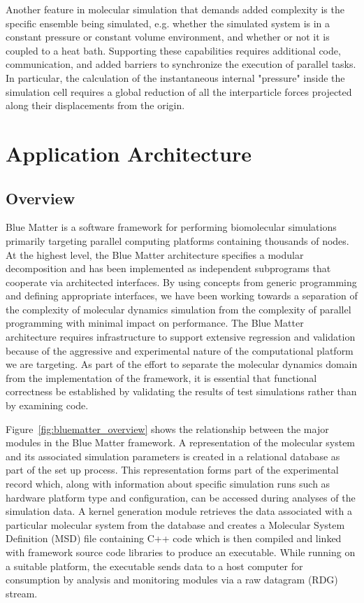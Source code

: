\documentclass[doublespacing]{elsart}
\begin{document}
Another feature in molecular simulation that demands added complexity
is the specific ensemble being simulated, e.g. whether the simulated
system is in a constant pressure or constant volume environment, and
whether or not it is coupled to a heat bath. Supporting these
capabilities requires additional code, communication, and added
barriers to synchronize the execution of parallel tasks.  In
particular, the calculation of the instantaneous internal "pressure"
inside the simulation cell requires a global reduction of all the
interparticle forces projected along their displacements from the
origin.

\section{Application Architecture}
\subsection{Overview}

Blue Matter is a software framework for performing biomolecular
simulations primarily targeting parallel computing platforms
containing thousands of nodes.  At the highest level, the Blue Matter
architecture specifies a modular decomposition and has been
implemented as independent subprograms that cooperate via architected
interfaces. By using concepts from generic
programming\cite{austern:1999} and defining appropriate interfaces, we
have been working towards a separation of the complexity of molecular
dynamics simulation from the complexity of parallel programming with
minimal impact on performance.  The Blue Matter architecture requires
infrastructure to support extensive regression and validation because
of the aggressive and experimental nature of the computational
platform we are targeting.  As part of the effort to separate the
molecular dynamics domain from the implementation of the framework, it
is essential that functional correctness be established by validating
the results of test simulations rather than by examining code.

Figure~\ref{fig:bluematter_overview} shows the relationship between
the major modules in the Blue Matter framework.  A representation of
the molecular system and its associated simulation parameters is
created in a relational database as part of the set up process.  This
representation forms part of the experimental record which, along with
information about specific simulation runs such as hardware platform
type and configuration, can be accessed during analyses of the
simulation data.  A kernel generation module retrieves the data
associated with a particular molecular system from the database and
creates a Molecular System Definition (MSD) file containing C++ code
which is then compiled and linked with framework source code libraries
to produce an executable.  While running on a suitable platform, the
executable sends data to a host computer for consumption by analysis
and monitoring modules via a raw datagram (RDG) stream.
\end{document}
